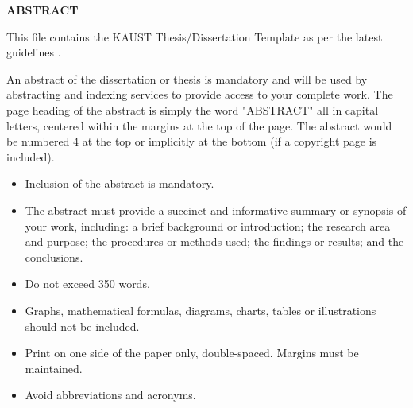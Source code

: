 
\begin{center}

\end{center}

\begin{center}
{{\bf\fontsize{14pt}{14.5pt}\selectfont \uppercase{ABSTRACT}}}
\end{center}

\doublespacing
{}



\begin{center}
{{\fontsize{14pt}{14.5pt}\selectfont {Your Thesis Title\\
Your Full Name}}}
\end{center}


This file contains the KAUST Thesis/Dissertation Template as per the latest guidelines \cite{guidelines}.

An abstract of the dissertation or thesis is mandatory and will be used by abstracting and indexing services to provide access to your complete work. The page heading of the abstract is simply the word "ABSTRACT" all in capital letters, centered within the margins at the top of the page. The abstract would be numbered 4 at the top or implicitly at the bottom (if a copyright page is included).

\begin{itemize}
\item Inclusion of the abstract is mandatory.
\item	The abstract must provide a succinct and informative summary or synopsis of your work, including: a brief background or introduction; the research area and purpose; the procedures or methods used; the findings or results; and the conclusions.
\item	Do not exceed 350 words.
\item	Graphs, mathematical formulas, diagrams, charts, tables or illustrations should not be included. 
\item	Print on one side of the paper only, double-spaced.  Margins must be maintained. 
\item	Avoid abbreviations and acronyms.

\end{itemize}

